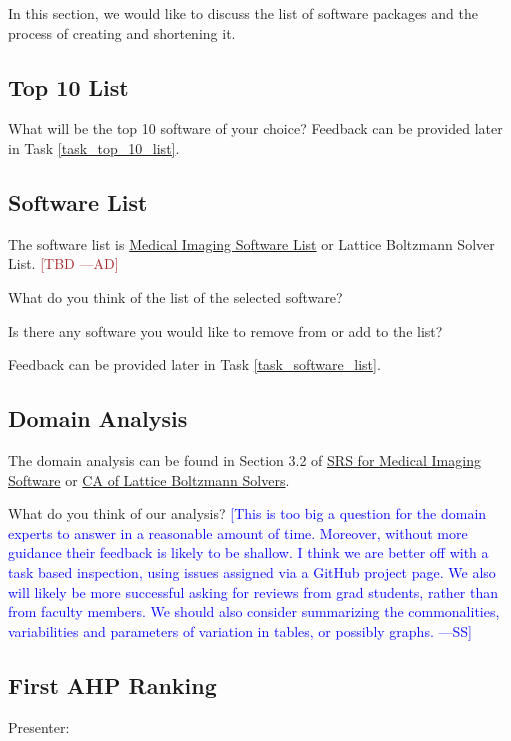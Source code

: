 \documentclass[12pt]{article}
\newcommand{\authornote}[3]{\textcolor{#1}{[#3 ---#2]}}
\newcommand{\authornote}[3]{}
\newcommand{\wss}[1]{\authornote{blue}{SS}{#1}} %
\newcommand{\ad}[1]{\authornote{brown}{AD}{#1}} %
\begin{document}
In this section, we would like to discuss the list of software packages and the
process of creating and shortening it.

\subsection{Top 10 List}
\label{top_10_list}
What will be the top 10 software of your choice? Feedback can be provided later
in Task \ref{task_top_10_list}.

\subsection{Software List}
\label{software_list}
The software list is
\href{https://docs.google.com/spreadsheets/d/122wU0v3ZtvDcqy8C4zKJ89kU-8fXAbo3Mzn6vcVXOi0/edit?usp=sharing}{Medical
	Imaging Software List} or Lattice Boltzmann Solver List. \ad{TBD}

What do you think of the list of the selected software?

Is there any software you would like to remove from or add to the list?

Feedback can be provided later in Task \ref{task_software_list}.

\subsection{Domain Analysis}
\label{domain_analysis}
The domain analysis can be found in Section 3.2 of
\href{https://github.com/Ao99/MISEG/blob/master/docs/SRS/SRS.pdf}{SRS for
Medical Imaging Software} or
\href{https://github.com/peter-michalski/LatticeBoltzmannSolvers/blob/master/docs/SRS/CA.pdf}{CA
of Lattice Boltzmann Solvers}.

What do you think of our analysis?  \wss{This is too big a question for the
  domain experts to answer in a reasonable amount of time.  Moreover, without
  more guidance their feedback is likely to be shallow.  I think we are better
  off with a task based inspection, using issues assigned via a GitHub project
  page.  We also will likely be more successful asking for reviews from grad
  students, rather than from faculty members.  We should also consider
  summarizing the commonalities, variabilities and parameters of variation in
  tables, or possibly graphs.}

\subsection{First AHP Ranking}
\label{first_AHP}
Presenter:
\end{document}
